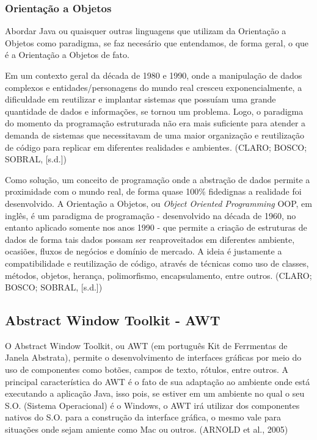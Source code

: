 \documentclass[a4paper,12pt]{article}
\begin{document}
\subsubsection{Orientação a Objetos}
Abordar Java ou quaisquer outras linguagens que utilizam da Orientação a Objetos como paradigma, se faz necesário que entendamos, de forma geral,
o que é a Orientação a Objetos de fato.

Em um contexto geral da década de 1980 e 1990, onde a manipulação de dados complexos e entidades/personagens do mundo real cresceu exponencialmente,
a dificuldade em reutilizar e implantar sistemas que possuíam uma grande quantidade de dados e informações, se tornou um problema. Logo, o paradigma do momento 
da programação estruturada não era mais suficiente para atender a demanda de sistemas que necessitavam de uma maior organização e reutilização de código 
para replicar em diferentes realidades e ambientes. (CLARO; BOSCO; SOBRAL, [s.d.])

Como solução, um conceito de programação onde a abstração de dados permite a proximidade com o mundo real, de forma quase 100\% fidedignas a realidade foi desenvolvido.
A Orientação a Objetos, ou \textit{Object Oriented Programming} OOP, em inglês, é um paradigma de programação - desenvolvido na década de 1960, no entanto aplicado somente 
nos anos 1990 - que permite a criação de estruturas de dados de forma tais dados possam ser reaproveitados em diferentes 
ambiente, ocasiões, fluxos de negócios e domínio de mercado. A ideia é justamente a compatibilidade e reutilização de código,
através de técnicas como uso de classes, métodos, objetos, herança, polimorfismo, encapsulamento, entre outros. (CLARO; BOSCO; SOBRAL, [s.d.])


\subsection{Abstract Window Toolkit - AWT}
O Abstract Window Toolkit, ou AWT (em português Kit de Ferrmentas de Janela Abstrata), permite o desenvolvimento de interfaces gráficas por 
meio do uso de componentes como botões, campos de texto, rótulos, entre outros. A principal característica do AWT é o fato de sua adaptação ao 
ambiente onde está executando a aplicação Java, isso pois, se estiver em um ambiente no qual o seu S.O. (Sistema Operacional) é o Windows,
o AWT irá utilizar dos componentes nativos do S.O. para a construção da interface gráfica, o mesmo vale para situações onde sejam amiente como Mac ou outros.
(ARNOLD et al., 2005)
\end{document}

